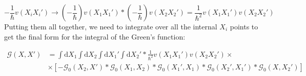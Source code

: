 \begin{equation}
- \frac{1}{\hbar} v \left( X_{i} X_{i}' \right)
\to
\left( - \frac{1}{\hbar} \right) v \left( X_{1} X_{1}' \right)
*
\left( - \frac{1}{\hbar} \right) v \left( X_{2} X_{2}' \right)
=
\frac{1}{\hbar^{2}} v \left( X_{1} X_{1}' \right) v \left( X_{2} X_{2}' \right)
\end{equation}
Putting them all together, we need to integrate over all the internal $X_{i}$ points to get the final form for the integral of the Green's function:

\begin{align}
\mathcal{G} \left( X, X' \right)
&=
\int \text{d}X_{1} \int \text{d}X_{2} \int \text{d}X_{1}' \int \text{d}X_{2}'
*
\frac{1}{\hbar^{2}} v \left( X_{1} X_{1}' \right) v \left( X_{2} X_{2}' \right)
\times \nonumber \\
&\times
\left[
- \mathcal{G}_{0} \left( X_{2}, X' \right)
*
\mathcal{G}_{0} \left( X_{1}, X_{2} \right)
*
\mathcal{G}_{0} \left( X_{1}', X_{1} \right)
*
\mathcal{G}_{0} \left( X_{2}', X_{1}' \right)
*
\mathcal{G}_{0} \left( X, X_{2}' \right)
\right]
\end{align}